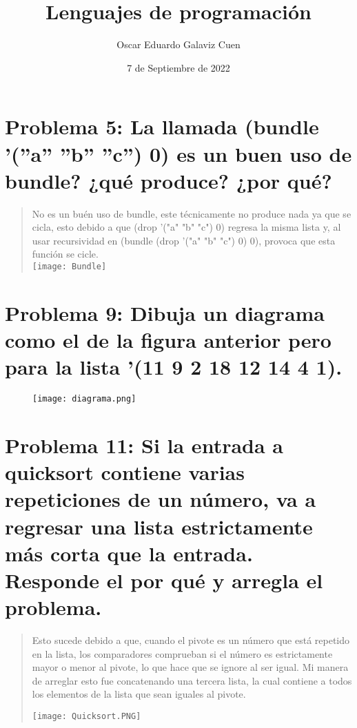 \documentclass{article}
\title{Lenguajes de programación}
\author{Oscar Eduardo Galaviz Cuen}
\date{7 de Septiembre de 2022}
\begin{document}
\maketitle

\section{Problema 5: La llamada (bundle ’(”a” ”b” ”c”) 0) es un buen uso de bundle? ¿qué produce? ¿por qué?}
\begin{quote}
    No es un buén uso de bundle, este técnicamente no produce nada ya que se cicla, esto debido a que (drop '("a" "b" "c") 0) regresa la misma lista y, al usar recursividad en (bundle (drop '("a" "b" "c") 0) 0), provoca que esta función se cicle.\\
    \texttt{[image: Bundle]}
\end{quote}

\section{Problema 9: Dibuja un diagrama como el de la figura anterior pero para la lista ’(11 9 2 18 12 14 4 1).}

\begin{figure}[H]
    \centering
    \texttt{[image: diagrama.png]}
    \label{fig:my_label}
\end{figure}

\section{Problema 11: Si la entrada a quicksort contiene varias repeticiones de un número, va a regresar una lista estrictamente más corta que la entrada. Responde el por qué y arregla el problema.}
\begin{quote}
    Esto sucede debido a que, cuando el pivote es un número que está repetido en la lista, los comparadores comprueban si el número es estrictamente mayor o menor al pivote, lo que hace que se ignore al ser igual. Mi manera de arreglar esto fue concatenando una tercera lista, la cual contiene a todos los elementos de la lista que sean iguales al pivote.
    
    \texttt{[image: Quicksort.PNG]}
\end{quote}
\end{document}
